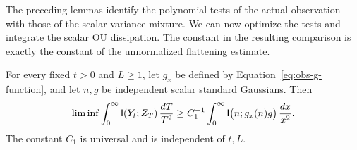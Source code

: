 The preceding lemmas identify the polynomial tests of the actual
observation with those of the scalar variance mixture.  We can now
optimize the tests and integrate the scalar OU dissipation.  The
constant in the resulting comparison is exactly the constant of
the unnormalized flattening estimate.

\begin{proposition}
\label{prop:information-lower}
For every fixed $t>0$ and $L\ge1$, let $g_x$ be defined by
Equation~\eqref{eq:obs-g-function}, and let $n,g$ be independent
scalar standard Gaussians.  Then
\begin{equation}\label{eq:obs-information-lower}
 \liminf\int_0^\infty\mathsf I(Y_t;Z_T)\,\frac{dT}{T^2}
 \ge C_1^{-1}\int_0^\infty
       \mathsf I\big(n;g_x(n)g\big)\,\frac{dx}{x^2}.
\end{equation}
The constant $C_1$ is universal and is independent of $t,L$.
\end{proposition}


